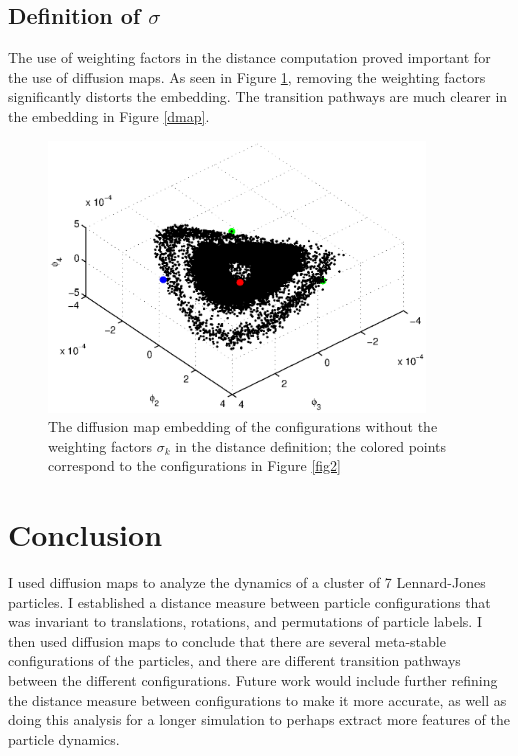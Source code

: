 \subsection{Definition of $\sigma$}
The use of weighting factors in the distance computation proved important for the use of diffusion maps. As seen in Figure \ref{dmap_nosigma}, removing the weighting factors significantly distorts the embedding. The transition pathways are much clearer in the embedding in Figure \ref{dmap}.

\begin{figure}[t]
\centering
\includegraphics[width=10cm]{dmap_nosigma.eps}
\caption[Diffusion maps embedding of Lennard-Jones cluster without weight factors]{The diffusion map embedding of the configurations without the weighting factors $\sigma_k$ in the distance definition; the colored points correspond to the configurations in Figure \ref{fig2}}
\label{dmap_nosigma}
\end{figure}

\section{Conclusion}
I used diffusion maps to analyze the dynamics of a cluster of 7 Lennard-Jones particles. I established a distance measure between particle configurations that was invariant to translations, rotations, and permutations of particle labels. I then used diffusion maps to conclude that there are several meta-stable configurations of the particles, and there are different transition pathways between the different configurations. Future work would include further refining the distance measure between configurations to make it more accurate, as well as doing this analysis for a longer simulation to perhaps extract more features of the particle dynamics.